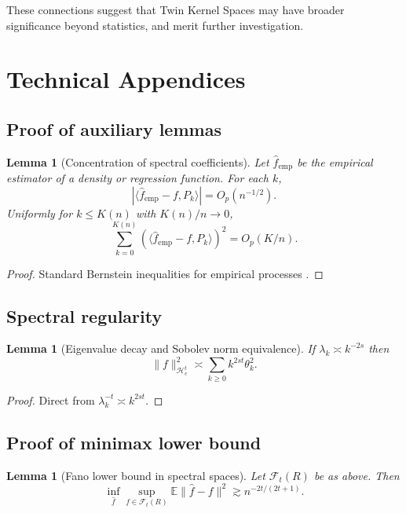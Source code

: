 \documentclass[11pt,a4paper]{article}
\newtheorem{lemma}[theorem]{Lemma}
\newcommand{\E}{\mathbb{E}}
\newcommand{\RKHS}{\mathcal{H}}
\newcommand{\ip}[2]{\langle #1, #2 \rangle}
\begin{document}
These connections suggest that Twin Kernel Spaces may have broader significance beyond statistics, and merit further investigation.

\appendix
\section{Technical Appendices}

\subsection{Proof of auxiliary lemmas}

\begin{lemma}[Concentration of spectral coefficients]\label{lem:concentration}
Let $\hat{f}_{\mathrm{emp}}$ be the empirical estimator of a density or regression function. For each $k$,
\[
|\ip{\hat{f}_{\mathrm{emp}} - f}{P_k}| = O_p(n^{-1/2}).
\]
Uniformly for $k \leq K(n)$ with $K(n)/n \to 0$,
\[
\sum_{k=0}^{K(n)} (\ip{\hat{f}_{\mathrm{emp}} - f}{P_k})^2 = O_p(K/n).
\]
\end{lemma}

\begin{proof}
Standard Bernstein inequalities for empirical processes \citep{vanderVaart1996}.
\end{proof}

\subsection{Spectral regularity}

\begin{lemma}[Eigenvalue decay and Sobolev norm equivalence]\label{lem:sobolev}
If $\lambda_k \asymp k^{-2s}$ then
\[
\|f\|_{\RKHS_e^t}^2 \asymp \sum_{k \geq 0} k^{2st} \theta_k^2.
\]
\end{lemma}

\begin{proof}
Direct from $\lambda_k^{-t} \asymp k^{2st}$.
\end{proof}

\subsection{Proof of minimax lower bound}

\begin{lemma}[Fano lower bound in spectral spaces]\label{lem:fano}
Let $\mathcal{F}_t(R)$ be as above. Then
\[
\inf_{\hat{f}} \sup_{f \in \mathcal{F}_t(R)} \E \|\hat{f} - f\|^2 \gtrsim n^{-2t/(2t+1)}.
\]
\end{lemma}
\end{document}

